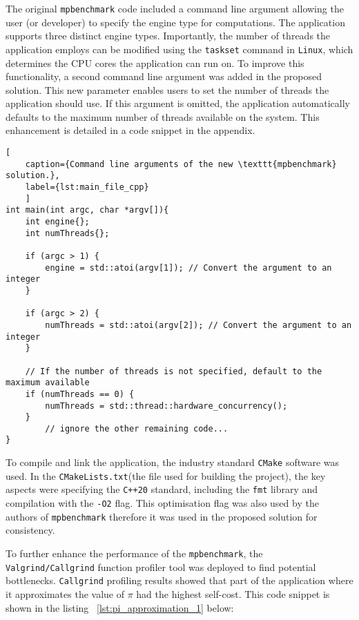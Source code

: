 The original \texttt{mpbenchmark} code included a command line argument allowing the user (or developer) to specify the engine type for computations. The application supports three distinct engine types. Importantly, the number of threads the application employs can be modified using the \texttt{taskset} command in \texttt{Linux}, which determines the CPU cores the application can run on. To improve this functionality, a second command line argument was added in the proposed solution. This new parameter enables users to set the number of threads the application should use. If this argument is omitted, the application automatically defaults to the maximum number of threads available on the system. This enhancement is detailed in a code snippet in the appendix.

\begin{lstlisting}[
	caption={Command line arguments of the new \texttt{mpbenchmark} solution.},
	label={lst:main_file_cpp}
	]
int main(int argc, char *argv[]){
	int engine{};
	int numThreads{};
		
	if (argc > 1) {
		engine = std::atoi(argv[1]); // Convert the argument to an integer
	}
		
	if (argc > 2) {
		numThreads = std::atoi(argv[2]); // Convert the argument to an integer
	}
		
	// If the number of threads is not specified, default to the maximum available
	if (numThreads == 0) {
		numThreads = std::thread::hardware_concurrency();
	}	
		// ignore the other remaining code...
}
\end{lstlisting}


To compile and link the application, the industry standard \texttt{CMake}\cite{cmake_about} software was used. In the \texttt{CMakeLists.txt}(the file used for building the project), the key aspects were specifying the \texttt{C++20} standard, including the \texttt{fmt} library and compilation with the \texttt{-O2} flag. This optimisation flag was also used by the authors of \texttt{mpbenchmark}\cite{mpbenchmark_paper} therefore it was used in the proposed solution for consistency. 

To further enhance the performance of the \texttt{mpbenchmark}, the \texttt{Valgrind/Callgrind} function profiler tool was deployed to find potential bottlenecks. \texttt{Callgrind} profiling results showed that part of the application where it approximates the value of $\pi$ had the highest self-cost. This code snippet is shown in the listing ~\ref{lst:pi_approximation_1} below:

